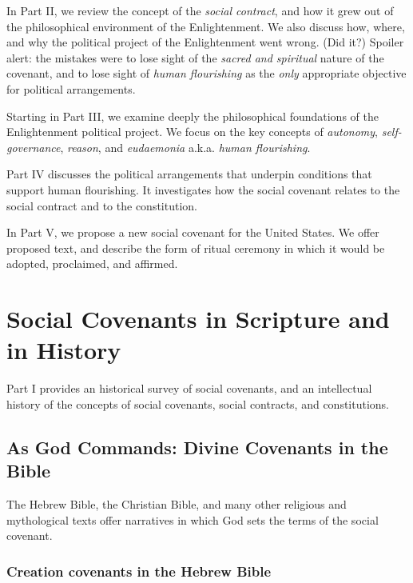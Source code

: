 \documentclass[
]{book}
\begin{document}
In Part II, we review the concept of the \emph{social contract}, and how it grew out of the philosophical environment of the Enlightenment. We also discuss how, where, and why the political project of the Enlightenment went wrong. (Did it?) Spoiler alert: the mistakes were to lose sight of the \emph{sacred and spiritual} nature of the covenant, and to lose sight of \emph{human flourishing} as the \emph{only} appropriate objective for political arrangements.

Starting in Part III, we examine deeply the philosophical foundations of the Enlightenment political project. We focus on the key concepts of \emph{autonomy}, \emph{self-governance}, \emph{reason}, and \emph{eudaemonia} a.k.a. \emph{human flourishing}.

Part IV discusses the political arrangements that underpin conditions that support human flourishing. It investigates how the social covenant relates to the social contract and to the constitution.

In Part V, we propose a new social covenant for the United States. We offer proposed text, and describe the form of ritual ceremony in which it would be adopted, proclaimed, and affirmed.

\hypertarget{part-social-covenants-in-scripture-and-in-history}{%
\part{Social Covenants in Scripture and in History}\label{part-social-covenants-in-scripture-and-in-history}}

Part I provides an historical survey of social covenants, and an intellectual history of the concepts of social covenants, social contracts, and constitutions.

\hypertarget{as-god-commands-divine-covenants-in-the-bible}{%
\chapter{As God Commands: Divine Covenants in the Bible}\label{as-god-commands-divine-covenants-in-the-bible}}

The Hebrew Bible, the Christian Bible, and many other religious and mythological texts offer narratives in which God sets the terms of the social covenant.

\hypertarget{creation-covenants-in-the-hebrew-bible}{%
\section{Creation covenants in the Hebrew Bible}\label{creation-covenants-in-the-hebrew-bible}}
\end{document}
